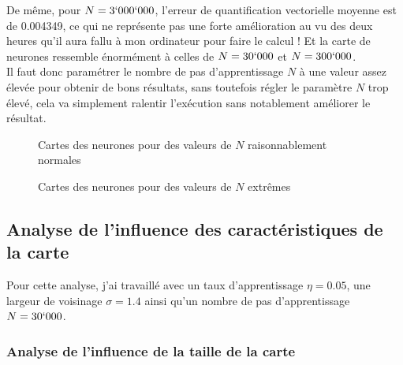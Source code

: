\documentclass{article}
\begin{document}
De même, pour $N = 3`000`000$, l'erreur de quantification vectorielle moyenne est de 0.004349, ce qui ne représente pas une forte amélioration au vu des deux heures qu'il aura fallu à mon ordinateur pour faire le calcul ! Et la carte de neurones ressemble énormément à celles de $N = 30`000$ et $N = 300`000$.\\
Il faut donc paramétrer le nombre de pas d'apprentissage $N$ à une valeur assez élevée pour obtenir de bons résultats, sans toutefois régler le paramètre $N$ trop élevé, cela va simplement ralentir l'exécution sans notablement améliorer le résultat.

\begin{figure}[H]
    \centering
    \hypertarget{figure-N-normales}{}
    \caption{Cartes des neurones pour des valeurs de $N$ raisonnablement normales}
    \label{figure-N-normales}
\end{figure}

\begin{figure}[H]
    \centering
    \hypertarget{figure-N-extremes}{}
    \caption{Cartes des neurones pour des valeurs de $N$ extrêmes}
    \label{figure-N-extremes}
\end{figure}


\subsection{Analyse de l'influence des caractéristiques de la carte}

Pour cette analyse, j'ai travaillé avec un taux d'apprentissage $\eta = 0.05$, une largeur de voisinage $\sigma = 1.4$ ainsi qu'un nombre de pas d'apprentissage $N=30`000$.\\

\subsubsection{Analyse de l'influence de la taille de la carte}
\end{document}
